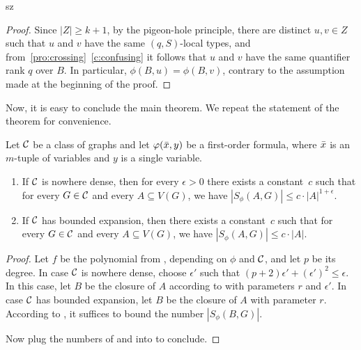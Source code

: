 \begin{change}{sz}
\begin{proof}

Since $|Z|\geq k+1$, by the pigeon-hole principle, there are  distinct $u,v\in Z$ such that 
$u$ and $v$ have the same $(q,S)$-local types,
and from~\cref{pro:crossing}~\cref{c:confusing} it follows that $u$ and $v$
have the same quantifier rank $q$ over $B$.
In particular, $\phi(B,u)=\phi(B,v)$, contrary to the assumption made at the beginning of the proof.
\end{proof}
\end{change}

Now, it is easy to conclude the main theorem. We repeat the statement of the theorem 
for convenience.

\setcounter{theorem}{2}
\begin{theorem}
Let $\mathcal{C}$ be a class of graphs and let $\varphi(\bar{x},y)$ be a first-order formula, where 
$\bar{x}$ is an $m$-tuple of variables and $y$ is a single variable. 
\begin{enumerate}
\item If $\mathcal{C}$ is nowhere dense, then for every $\epsilon>0$ 
there exists a constant~$c$ such that for every $G\in \mathcal{C}$ and every
$A\subseteq V(G)$, we have $|S_\phi(A,G)|\leq c\cdot |A|^{1+\epsilon}.$
\item If $\mathcal{C}$ has bounded expansion, then there exists a constant~$c$ such that for every $G\in \mathcal{C}$ and every $A\subseteq V(G)$, we have $|S_\phi(A,G)|\leq c\cdot |A|$.
\end{enumerate}
\end{theorem}
\begin{proof}
Let $f$ be the polynomial from ,
depending on $\phi$ and $\mathcal{C}$,
and let $p$ be its degree.
 In case $\mathcal{C}$ is nowhere dense, choose
$\epsilon'$ such that $(p+2)\epsilon'+(\epsilon')^2\leq \epsilon$. In this case,
let $B$ be the closure of $A$ according to  with 
parameters $r$ and $\epsilon'$. In case $\mathcal{C}$ has bounded expansion, let $B$ be the closure of $A$ with parameter $r$.
According to , it suffices to bound the
number $|S_\phi(B,G)|$. 

Now plug the numbers of  and  
into  to conclude. 
\end{proof}

